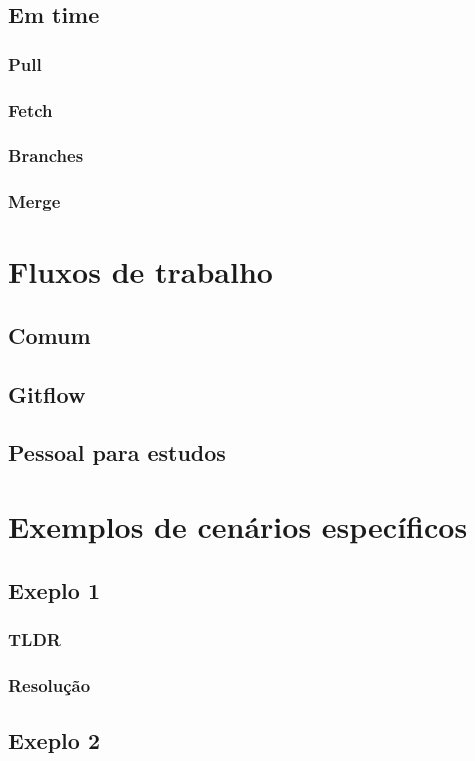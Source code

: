 \documentclass{apostila}
\begin{document}
\section{Em time}
\subsection{Pull}
\subsection{Fetch}
\subsection{Branches}
\subsection{Merge}


\chapter{Fluxos de trabalho}
\section{Comum}
\section{Gitflow}
\section{Pessoal para estudos}


\chapter{Exemplos de cenários específicos}
\section{Exeplo 1}
\subsection{TLDR}
\subsection{Resolução}
\section{Exeplo 2}
\end{document}

